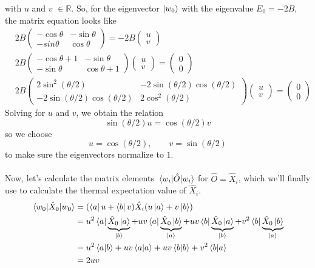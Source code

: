 \documentclass[../thesis_main.tex]{subfiles}
\begin{document}
with $u$ and $v$ $\in \mathbb{R}$. So, for the eigenvector $\ket{w_0}$  with the eigenvalue $E_0 = -2B$, the matrix equation looks like
\begin{align*}
    & 2B \left(\begin{array}{cc}
    -\cos \theta  & -\sin \theta  \\ 
    -sin \theta  & \cos \theta 
    \end{array}\right) = -2B 
    \left(\begin{array}{c}
    u \\ 
    v
    \end{array}\right) \\
    & 2B \left(\begin{array}{cc}
    -\cos \theta +1 & -\sin \theta  \\ 
    - \sin \theta  & \cos \theta + 1
    \end{array}\right)
    \left(\begin{array}{c}
    u \\ 
    v
    \end{array}\right) = 
    \left(\begin{array}{c}
    0 \\ 
    0
    \end{array}\right) \\
    & 2B \left(\begin{array}{cc}
    2 \sin^2(\theta/2) & -2\sin(\theta /2) \cos(\theta /2) \\ 
    -2 \sin(\theta /2) \cos(\theta /2) & 2 \cos^2(\theta /2)
    \end{array}\right) 
    \left(\begin{array}{c}
    u \\ 
    v
    \end{array}\right) = 
    \left(\begin{array}{c}
    0 \\ 
    0
    \end{array}\right)
\end{align*}
Solving for $u$ and $v$, we obtain the relation 
\[
    \sin (\theta /2) u = \cos (\theta /2) v
\]   
so we choose 
\[
    \boxed{u = \cos(\theta /2), \qquad v = \sin (\theta /2)}
\]
to make sure the eigenvectors normalize to $1$.~\\~\\
Now, let's calculate the matrix elements $\mel{w_i}{\hat{O}}{w_i}$ for $\hat{O} = \hat{X}_i$, which we'll finally use to calculate the thermal expectation value of $\hat{X}_i$.
\begin{align*}
    \mel{w_0}{\hat{X}_0}{w_0} & = (\bra{a} u + \bra{b} v) \hat{X}_i (u \ket{a} + v \ket{b}) \\
    & = u^2 \bra{a}\underbrace{{\hat{X}_0}\ket{a}}_{\ket{b}} +  uv \bra{a}\underbrace{{\hat{X}_0}\ket{b}}_{\ket{a}} + uv \bra{b}\underbrace{{\hat{X}_0}\ket{a}}_{\ket{b}} + v^2 \bra{b}\underbrace{{\hat{X}_0}\ket{b}}_{\ket{a}} \\ 
    & = u^2 \braket{a}{b} + uv \braket{a}{a} + uv \braket{b}{b} + v^2\braket{b}{a} \\
    & = 2uv
\end{align*} 
\end{document}
